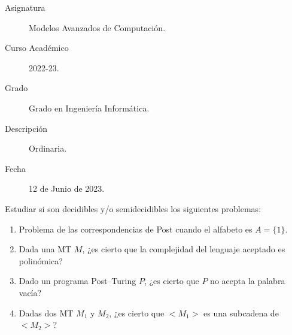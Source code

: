\documentclass[12pt]{article}
\begin{document}

    
    

    \begin{description}
        \item[Asignatura] Modelos Avanzados de Computación.
        \item[Curso Académico] 2022-23.
        \item[Grado] Grado en Ingeniería Informática.
        \item[Descripción] Ordinaria.
        \item[Fecha] 12 de Junio de 2023.  
    \end{description}
    \newpage



    \begin{ejercicio}[2 puntos]
        Estudiar si son decidibles y/o semidecidibles los siguientes problemas:
        \begin{enumerate}
            \item Problema de las correspondencias de Post cuando el alfabeto es $A = \{1\}$.
            \item Dada una MT $M$, ¿es cierto que la complejidad del lenguaje aceptado es polinómica?
            \item Dado un programa Post--Turing $P$, ¿es cierto que $P$ no acepta la palabra vacía?
            \item Dadas dos MT $M_1$ y $M_2$, ¿es cierto que $<M_1>$ es una subcadena de $<M_2>$?
        \end{enumerate}
    \end{ejercicio}
\end{document}
